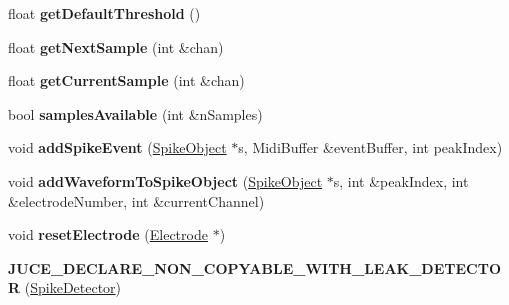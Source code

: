 \begin{DoxyCompactItemize}
\item 
\hypertarget{classSpikeDetector_a7c562f7bf7f40e605a5e157ee1e7cdcd}{float {\bfseries get\-Default\-Threshold} ()}\label{classSpikeDetector_a7c562f7bf7f40e605a5e157ee1e7cdcd}

\item 
\hypertarget{classSpikeDetector_aada970694c2dfca0f446efade94f7c86}{float {\bfseries get\-Next\-Sample} (int \&chan)}\label{classSpikeDetector_aada970694c2dfca0f446efade94f7c86}

\item 
\hypertarget{classSpikeDetector_af2792d58c9cf0685b082b055df685761}{float {\bfseries get\-Current\-Sample} (int \&chan)}\label{classSpikeDetector_af2792d58c9cf0685b082b055df685761}

\item 
\hypertarget{classSpikeDetector_adcc1f42731e9b6b48ab089a07dde86f3}{bool {\bfseries samples\-Available} (int \&n\-Samples)}\label{classSpikeDetector_adcc1f42731e9b6b48ab089a07dde86f3}

\item 
\hypertarget{classSpikeDetector_a209554bc3445b84c9c8bad5301385da8}{void {\bfseries add\-Spike\-Event} (\hyperlink{structSpikeObject}{Spike\-Object} $\ast$s, Midi\-Buffer \&event\-Buffer, int peak\-Index)}\label{classSpikeDetector_a209554bc3445b84c9c8bad5301385da8}

\item 
\hypertarget{classSpikeDetector_aad6ba0205c76fec7aa84769937e24ef9}{void {\bfseries add\-Waveform\-To\-Spike\-Object} (\hyperlink{structSpikeObject}{Spike\-Object} $\ast$s, int \&peak\-Index, int \&electrode\-Number, int \&current\-Channel)}\label{classSpikeDetector_aad6ba0205c76fec7aa84769937e24ef9}

\item 
\hypertarget{classSpikeDetector_a779cd2ac50c56febd836d9aaddbdcd5a}{void {\bfseries reset\-Electrode} (\hyperlink{structSpikeDetector_1_1Electrode}{Electrode} $\ast$)}\label{classSpikeDetector_a779cd2ac50c56febd836d9aaddbdcd5a}

\item 
\hypertarget{classSpikeDetector_a8fb28af27a5b3b47d69faacec0f73c41}{{\bfseries J\-U\-C\-E\-\_\-\-D\-E\-C\-L\-A\-R\-E\-\_\-\-N\-O\-N\-\_\-\-C\-O\-P\-Y\-A\-B\-L\-E\-\_\-\-W\-I\-T\-H\-\_\-\-L\-E\-A\-K\-\_\-\-D\-E\-T\-E\-C\-T\-O\-R} (\hyperlink{classSpikeDetector}{Spike\-Detector})}\label{classSpikeDetector_a8fb28af27a5b3b47d69faacec0f73c41}

\end{DoxyCompactItemize}
